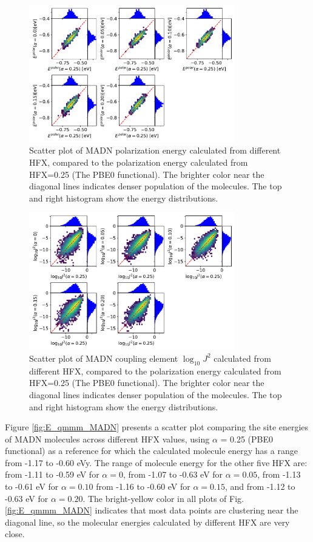 \documentclass[%
 reprint,
 amsmath,amssymb,
 aps,
]{revtex4-2}
\begin{document}
\begin{figure}
  \centering
  \includegraphics[width=0.80\textwidth]{figs/scatterEdip_qmmm.pdf}
  \caption{Scatter plot of MADN polarization energy calculated from different HFX, compared to the polarization energy calculated from HFX=0.25 (The PBE0 functional). The brighter color near the diagonal lines indicates denser population of the molecules.  The top and right histogram show the energy distributions.}
  \label{fig:Edip_qmmm_MADN}
\end{figure}

\begin{figure}
  \centering
  \includegraphics[width=0.80\textwidth]{figs/scatterJ_all.pdf}
  \caption{Scatter plot of MADN coupling element $\log_{10} J^2$ calculated from different HFX, compared to the polarization energy calculated from HFX=0.25 (The PBE0 functional). The brighter color near the diagonal lines indicates denser population of the molecules.  The top and right histogram show the energy distributions.}
  \label{fig:J_MADN}
\end{figure}

Figure \ref{fig:E_qmmm_MADN} presents a scatter plot comparing the site energies of MADN molecules across different HFX values, using $\alpha$ = 0.25 (PBE0 functional) as a reference for which the calculated molecule energy has a range from -1.17 to -0.60 \unit[]{eV}y.
The range of molecule energy for the other five HFX are: 
from -1.11 to -0.59 \unit[]{eV} for $\alpha=0$, 
from -1.07 to -0.63 \unit[]{eV} for $\alpha=0.05$, 
from -1.13 to -0.61 \unit[]{eV} for $\alpha=0.10$
from -1.16 to -0.60 \unit[]{eV} for $\alpha=0.15$, 
and from -1.12 to -0.63 \unit[]{eV} for $\alpha=0.20$.
The bright-yellow color in all plots of Fig. \ref{fig:E_qmmm_MADN} indicates that most data points are clustering near the diagonal line, so the molecular energies calculated by different HFX are very close.
\end{document}
